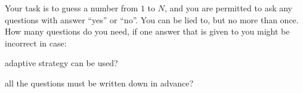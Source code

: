 Your task is to guess a number from $1$ to $N$, and you are permitted to ask any questions with answer
``yes'' or ``no''. You can be lied to, but no more than once. How many questions do you need, if one
answer that is given to you might be incorrect in case:
\begin{enumlet}
    \item adaptive strategy can be used?
    \item all the questions must be written down in advance?
\end{enumlet}
